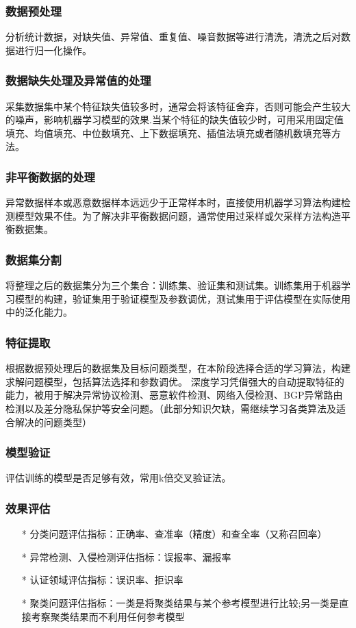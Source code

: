 \documentclass[UTF8]{ctexart}
\begin{document}
	\subsubsection{数据预处理}
	分析统计数据，对缺失值、异常值、重复值、噪音数据等进行清洗，清洗之后对数据进行归一化操作。
	\subsubsection{数据缺失处理及异常值的处理}
	采集数据集中某个特征缺失值较多时，通常会将该特征舍弃，否则可能会产生较大的噪声，影响机器学习模型的效果.当某个特征的缺失值较少时，可用采用固定值填充、均值填充、中位数填充、上下数据填充、插值法填充或者随机数填充等方法。
	\subsubsection{非平衡数据的处理}
	异常数据样本或恶意数据样本远远少于正常样本时，直接使用机器学习算法构建检测模型效果不佳。为了解决非平衡数据问题，通常使用过采样或欠采样方法构造平衡数据集。
	\subsubsection{数据集分割}
	将整理之后的数据集分为三个集合：训练集、验证集和测试集。训练集用于机器学习模型的构建，验证集用于验证模型及参数调优，测试集用于评估模型在实际使用中的泛化能力。
	\subsubsection{特征提取}
	根据数据预处理后的数据集及目标问题类型，在本阶段选择合适的学习算法，构建求解问题模型，包括算法选择和参数调优。
	深度学习凭借强大的自动提取特征的能力，被用于解决异常协议检测、恶意软件检测、网络入侵检测、BGP异常路由检测以及差分隐私保护等安全问题。（此部分知识欠缺，需继续学习各类算法及适合解决的问题类型）
	\subsubsection{模型验证}
	评估训练的模型是否足够有效，常用k倍交叉验证法。
	\subsubsection{效果评估}
	\begin{itemize}
	\item[*] 分类问题评估指标：正确率、查准率（精度）和查全率（又称召回率）
	\item[*] 异常检测、入侵检测评估指标：误报率、漏报率
	\item[*] 认证领域评估指标：误识率、拒识率
	\item[*] 聚类问题评估指标：一类是将聚类结果与某个参考模型进行比较;另一类是直接考察聚类结果而不利用任何参考模型
	\end{itemize}
\end{document}
